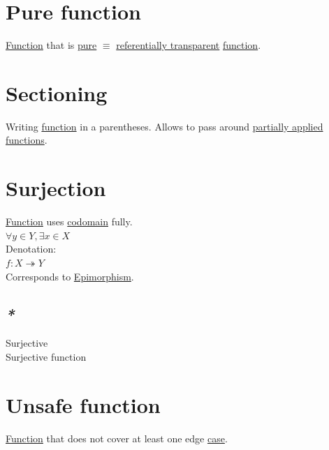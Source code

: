 \documentclass[a4paper,14pt,oneside]{book}
\begin{document}
\section{\label{org95131ad}Pure function}
\label{sec:orgeb38b8b}

\hyperref[orge00b05b]{Function} that is \hyperref[org6d0d804]{pure} \(\equiv\) \hyperref[org69bdd94]{referentially transparent} \hyperref[orge00b05b]{function}.\\

\section{\label{orgf35ee68}Sectioning}
\label{sec:org1521e6c}
Writing \hyperref[orge00b05b]{function} in a parentheses. Allows to pass around \hyperref[org908c3b4]{partially applied} \hyperref[org2d0eb2e]{functions}.\\

\section{\label{org9d79276}Surjection}
\label{sec:org57c742b}
\hyperref[orge00b05b]{Function} uses \hyperref[org2fb83bf]{codomain} fully.\\

\(\forall y \in Y, \exists x \in X\)\\

Denotation:\\
\(f : X \twoheadrightarrow Y\)\\

Corresponds to \hyperref[org5088389]{Epimorphism}.\\

\subsection{\emph{*}}
\label{sec:orgcbb0216}

\label{org8394662}Surjective\\
\label{org1fc2e69}Surjective function\\

\section{\label{org5414369}Unsafe function}
\label{sec:orgd18363b}
\hyperref[orge00b05b]{Function} that does not cover at least one edge \hyperref[orgbaad414]{case}.\\
\end{document}
